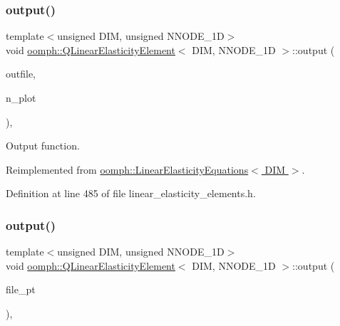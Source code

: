 \subsubsection{\texorpdfstring{output()}{output()}\hspace{0.1cm}{\footnotesize\ttfamily [2/4]}}
{\footnotesize\ttfamily template$<$unsigned D\+IM, unsigned N\+N\+O\+D\+E\+\_\+1D$>$ \\
void \hyperlink{classoomph_1_1QLinearElasticityElement}{oomph\+::\+Q\+Linear\+Elasticity\+Element}$<$ D\+IM, N\+N\+O\+D\+E\+\_\+1D $>$\+::output (\begin{DoxyParamCaption}\item[{std\+::ostream \&}]{outfile,  }\item[{const unsigned \&}]{n\+\_\+plot }\end{DoxyParamCaption})\hspace{0.3cm}{\ttfamily [inline]}, {\ttfamily [virtual]}}



Output function. 



Reimplemented from \hyperlink{classoomph_1_1LinearElasticityEquations_ad651870ca4e0f45f7023407656d034ee}{oomph\+::\+Linear\+Elasticity\+Equations$<$ D\+I\+M $>$}.



Definition at line 485 of file linear\+\_\+elasticity\+\_\+elements.\+h.

\mbox{\label{classoomph_1_1QLinearElasticityElement_a16db5e5ba60abbb8b79e1fce0ebd892e}} 
\subsubsection{\texorpdfstring{output()}{output()}\hspace{0.1cm}{\footnotesize\ttfamily [3/4]}}
{\footnotesize\ttfamily template$<$unsigned D\+IM, unsigned N\+N\+O\+D\+E\+\_\+1D$>$ \\
void \hyperlink{classoomph_1_1QLinearElasticityElement}{oomph\+::\+Q\+Linear\+Elasticity\+Element}$<$ D\+IM, N\+N\+O\+D\+E\+\_\+1D $>$\+::output (\begin{DoxyParamCaption}\item[{F\+I\+LE $\ast$}]{file\+\_\+pt }\end{DoxyParamCaption})\hspace{0.3cm}{\ttfamily [inline]}, {\ttfamily [virtual]}}



